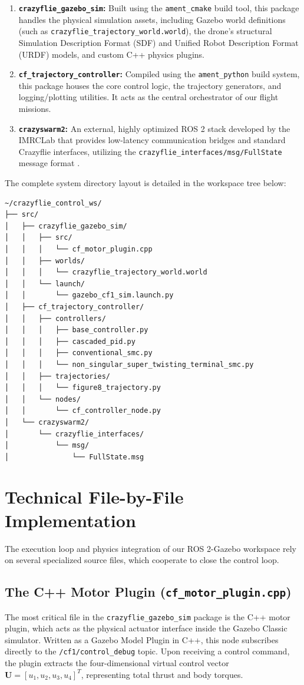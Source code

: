 \begin{enumerate}
    \item \textbf{\texttt{crazyflie\_gazebo\_sim}:} Built using the \texttt{ament\_cmake} build tool, this package handles the physical simulation assets, including Gazebo world definitions (such as \texttt{crazyflie\_trajectory\_world.world}), the drone's structural Simulation Description Format (SDF) and Unified Robot Description Format (URDF) models, and custom C++ physics plugins.
    \item \textbf{\texttt{cf\_trajectory\_controller}:} Compiled using the \texttt{ament\_python} build system, this package houses the core control logic, the trajectory generators, and logging/plotting utilities. It acts as the central orchestrator of our flight missions.
    \item \textbf{\texttt{crazyswarm2}:} An external, highly optimized ROS 2 stack developed by the IMRCLab that provides low-latency communication bridges and standard Crazyflie interfaces, utilizing the \texttt{crazyflie\_interfaces/msg/FullState} message format \cite{ref_90}.
\end{enumerate}

The complete system directory layout is detailed in the workspace tree below:

\begin{verbatim}
~/crazyflie_control_ws/
├── src/
│   ├── crazyflie_gazebo_sim/
│   │   ├── src/
│   │   │   └── cf_motor_plugin.cpp
│   │   ├── worlds/
│   │   │   └── crazyflie_trajectory_world.world
│   │   └── launch/
│   │       └── gazebo_cf1_sim.launch.py
│   ├── cf_trajectory_controller/
│   │   ├── controllers/
│   │   │   ├── base_controller.py
│   │   │   ├── cascaded_pid.py
│   │   │   ├── conventional_smc.py
│   │   │   └── non_singular_super_twisting_terminal_smc.py
│   │   ├── trajectories/
│   │   │   └── figure8_trajectory.py
│   │   └── nodes/
│   │       └── cf_controller_node.py
│   └── crazyswarm2/
│       └── crazyflie_interfaces/
│           └── msg/
│               └── FullState.msg
\end{verbatim}

\section{Technical File-by-File Implementation}
The execution loop and physics integration of our ROS 2-Gazebo workspace rely on several specialized source files, which cooperate to close the control loop.

\subsection{The C++ Motor Plugin (\texttt{cf\_motor\_plugin.cpp})}
The most critical file in the \texttt{crazyflie\_gazebo\_sim} package is the C++ motor plugin, which acts as the physical actuator interface inside the Gazebo Classic simulator. Written as a Gazebo Model Plugin in C++, this node subscribes directly to the \texttt{/cf1/control\_debug} topic. Upon receiving a control command, the plugin extracts the four-dimensional virtual control vector $\bm{U} = [u_1, u_2, u_3, u_4]^T$, representing total thrust and body torques. 

